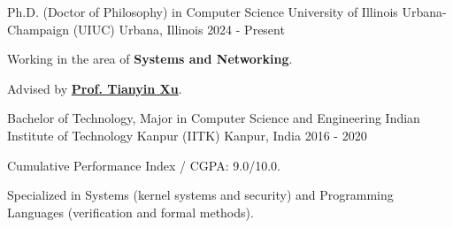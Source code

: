 

  \cventry
    {Ph.D. (Doctor of Philosophy) in Computer Science}
    {University of Illinois Urbana-Champaign (UIUC)}
    {Urbana, Illinois}
    {2024 - Present}
    {
      \begin{cvitems}
        \item Working in the area of \textbf{Systems and Networking}.
        \item Advised by \href{https://tianyin.github.io/}{\textbf{Prof. Tianyin Xu}}.
      \end{cvitems}
    }

  \cventry
    {Bachelor of Technology, Major in Computer Science and Engineering}
    {Indian Institute of Technology Kanpur (IITK)}
    {Kanpur, India}
    {2016 - 2020}
    {
      \begin{cvitems}
        \item Cumulative Performance Index / CGPA: 9.0/10.0.
        \item Specialized in Systems (kernel systems and security) and Programming Languages (verification and formal methods).
      \end{cvitems}
    }

